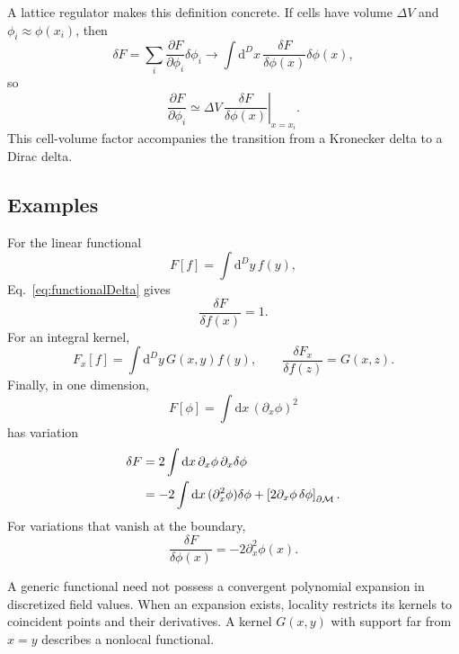 \documentclass[11pt]{article}
\newcommand{\dd}{\mathrm{d}}
\newcommand{\cM}{\mathcal{M}}
\begin{document}
A lattice regulator makes this definition concrete. If cells have volume
\(\Delta V\) and \(\phi_i\approx\phi(x_i)\), then
\begin{equation}
  \delta F=\sum_i\frac{\partial F}{\partial\phi_i}\delta\phi_i
  \longrightarrow
  \int\dd^D x\,
  \frac{\delta F}{\delta\phi(x)}\delta\phi(x),
\end{equation}
so
\begin{equation}
  \frac{\partial F}{\partial\phi_i}
  \simeq \Delta V\,
  \left.\frac{\delta F}{\delta\phi(x)}\right|_{x=x_i}.
  \label{eq:latticeFunctionalDerivative}
\end{equation}
This cell-volume factor accompanies the transition from a Kronecker delta to
a Dirac delta.

\subsection{Examples}

For the linear functional
\begin{equation}
  F[f]=\int\dd^D y\,f(y),
\end{equation}
Eq.~\eqref{eq:functionalDelta} gives
\begin{equation}
  \frac{\delta F}{\delta f(x)}=1.
\end{equation}
For an integral kernel,
\begin{equation}
  F_x[f]=\int\dd^D y\,G(x,y)f(y),
  \qquad
  \frac{\delta F_x}{\delta f(z)}=G(x,z).
\end{equation}
Finally, in one dimension,
\begin{equation}
  F[\phi]=\int\dd x\,(\partial_x\phi)^2
\end{equation}
has variation
\begin{align}
  \delta F
  &=2\int\dd x\,\partial_x\phi\,\partial_x\delta\phi\notag\\
  &=-2\int\dd x\,(\partial_x^2\phi)\delta\phi
  +\left[2\partial_x\phi\,\delta\phi\right]_{\partial\cM}.
\end{align}
For variations that vanish at the boundary,
\begin{equation}
  \frac{\delta F}{\delta\phi(x)}=-2\partial_x^2\phi(x).
  \label{eq:derivativeFunctional}
\end{equation}

\begin{remarkbox}
A generic functional need not possess a convergent polynomial expansion in
discretized field values. When an expansion exists, locality restricts its
kernels to coincident points and their derivatives. A kernel \(G(x,y)\) with
support far from \(x=y\) describes a nonlocal functional.
\end{remarkbox}
\end{document}
